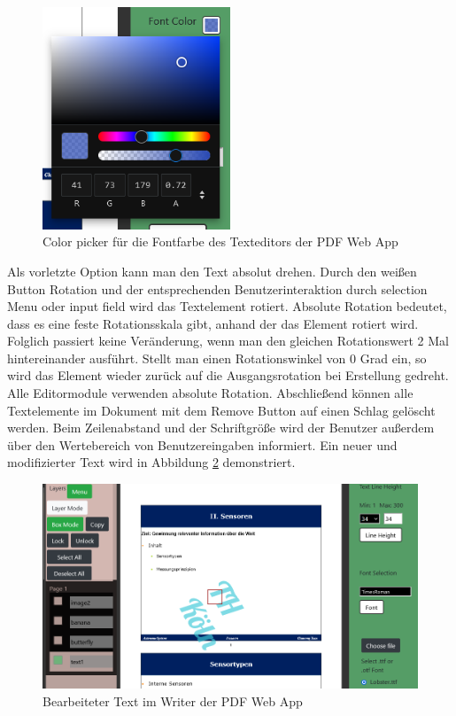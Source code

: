 \begin{figure}[!htbp]
	\centering
	\includegraphics[width=0.5\textwidth]{"images/fontcolor.png"}
	\caption{Color picker für die Fontfarbe des Texteditors der PDF Web App}
	\label{fig:fontcolor}
\end{figure}

Als vorletzte Option kann man den Text absolut drehen. Durch den weißen Button Rotation und der entsprechenden Benutzerinteraktion durch selection Menu oder input field wird das Textelement rotiert. Absolute Rotation bedeutet, dass es eine feste Rotationsskala gibt, anhand der das Element rotiert wird. Folglich passiert keine Veränderung, wenn man den gleichen Rotationswert 2 Mal hintereinander ausführt. Stellt man einen Rotationswinkel von 0 Grad ein, so wird das Element wieder zurück auf die Ausgangsrotation bei Erstellung gedreht. Alle Editormodule verwenden absolute Rotation. Abschließend können alle Textelemente im Dokument mit dem Remove Button auf einen Schlag gelöscht werden. Beim Zeilenabstand und der Schriftgröße wird der Benutzer außerdem über den Wertebereich von Benutzereingaben informiert. Ein neuer und modifizierter Text wird in Abbildung \ref{fig:text} demonstriert.

\begin{figure}[!htbp]
	\centering
	\includegraphics[width=1\textwidth]{"images/text.png"}
	\caption{Bearbeiteter Text im Writer der PDF Web App}
	\label{fig:text}
\end{figure}

